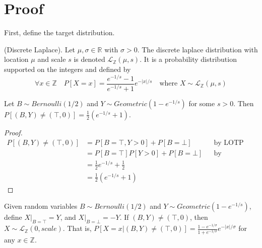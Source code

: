 \documentclass{article}
\begin{document}
\section{Proof}

First, define the target distribution.

\begin{definition}
    (Discrete Laplace). Let $\mu, \sigma \in \mathbb{R}$ with $\sigma > 0$. The discrete laplace distribution with location $\mu$ and scale $s$ is denoted $\mathcal{L}_\mathbb{Z}(\mu, s)$. It is a probability distribution supported on the integers and defined by \cite{BV17}
\begin{equation*}
    \forall x \in \mathbb{Z} \quad  P[X = x] = \frac{e^{-1/s} - 1}{e^{-1/s} + 1} e^{-|x|/s} \quad \text{where } X \sim \mathcal{L}_\mathbb{Z}(\mu, s)
\end{equation*}
\end{definition}


\begin{lemma}
\label{P_B_Y_ne_T_0}
Let $B \sim Bernoulli(1/2)$ and $Y \sim Geometric(1 - e^{-1/s})$ for some $s > 0$. Then $P[(B, Y) \neq (\top, 0)] = \frac{1}{2} (e^{-1/s} + 1)$\cite{CKS20}.
\end{lemma}

\begin{proof}
\begin{align*}
    P[(B, Y) \neq (\top, 0)] &= P[B = \top, Y > 0] + P[B = \bot] && \text{by LOTP} \\
    &= P[B = \top] P[Y > 0] + P[B = \bot] && \text{by independence of B, Y} \\
    &= \frac{1}{2} e^{-1/s} + \frac{1}{2} \\
    &= \frac{1}{2} (e^{-1/s} + 1)
\end{align*}
\end{proof}

\begin{theorem}
\label{P_Lx_BY_ne_T0}
Given random variables $B \sim Bernoulli(1/2)$ and $Y \sim Geometric(1 - e^{-1/s})$, define $X|_{B=\top} = Y$, and $X|_{B=\bot} = -Y$. If $(B, Y) \neq (\top, 0)$, then $X \sim \mathcal{L}_\mathbb{Z}(0, scale)$. That is, $P[X = x | (B, Y) \neq (\top, 0)] = \frac{1 - e^{-1/\sigma}}{1 + e^{-1/\sigma}} e^{-|x|/\sigma}$ for any $x \in \mathbb{Z}$\cite{CKS20}.
\end{theorem}
\end{document}

